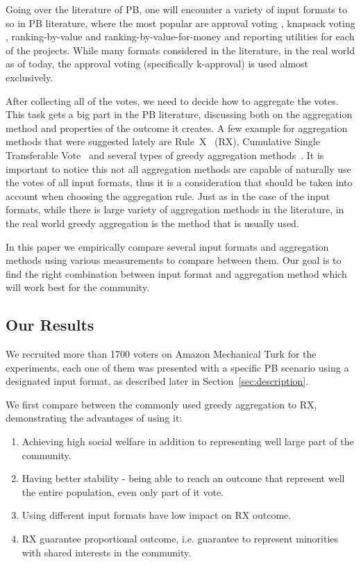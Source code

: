 \documentclass[10pt]{article}
\begin{document}
Going over the literature of PB, one will encounter a variety of input formats to so in PB literature, where the most popular are approval voting \cite{aziz2021participatory, aziz2017proportionally}, knapsack voting \cite{goel2019knapsack, fluschnik2019fair}, 
ranking-by-value and ranking-by-value-for-money \cite{aziz2020expanding, benade2020preference}
and reporting utilities \cite{peters2020proportional} for each of the projects. While many formats considered in the literature, in the real world as of today, the approval voting (specifically k-approval) is used almost exclusively. 

After collecting all of the votes, we need to decide how to aggregate the votes. This task gets a big part in the PB literature, discussing both on the aggregation method and properties of the outcome it creates. A few example for aggregation methods that were suggested lately are Rule~X~\citep{peters2020proportional} (RX), Cumulative Single Transferable Vote~\citep{skowron2020participatory} and several types of greedy aggregation methods~\citep{talmon2019framework}. It is important to notice this not all aggregation methods are capable of naturally use the votes of all input formats, thus it is a consideration that should be taken into account when choosing the aggregation rule. Just as in the case of the input formats, while there is large variety of aggregation methods in the literature, in the real world greedy aggregation is the method that is usually used.

In this paper we empirically compare several input formats and aggregation methods using various measurements to compare between them. Our goal is to find the right combination between input format and aggregation method which will work best for the community.

\subsection{Our Results}

We recruited more than 1700 voters on Amazon Mechanical Turk for the experiments, each one of them was presented with a specific PB scenario using a designated input format, as described later in Section~\ref{sec:description}.

We first compare between the commonly used greedy aggregation to RX, demonstrating the advantages of using it:
\begin{enumerate}
    \item Achieving high social welfare in addition to representing well large part of the community.
    \item Having better stability - being able to reach an outcome that represent well the entire population, even only part of it vote.
    \item Using different input formats have low impact on RX outcome.
    \item RX guarantee proportional outcome, i.e. guarantee to represent minorities with shared interests in the community.
\end{enumerate}
\end{document}
